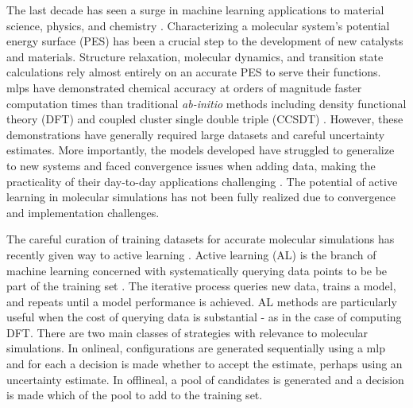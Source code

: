 \documentclass[
 reprint,
 amsmath,
 amssymb,
 aps,
]{revtex4-1}
\begin{document}
The last decade has seen a surge in machine learning applications to material science, physics, and chemistry \cite{Artrith2014, Rupp2015, Natarajan2016, Peterson2016, Behler2016, Khorshidi2016, Bartok2010}. Characterizing a molecular system's potential energy surface (PES) has been a crucial step to the development of new catalysts and materials. Structure relaxation, molecular dynamics, and transition state calculations rely almost entirely on an accurate PES to serve their functions. \gls{mlp}s have demonstrated chemical accuracy at orders of magnitude faster computation times than traditional \textit{ab-initio} methods including density functional theory (DFT) and coupled cluster single double triple (CCSDT)  \cite{Zuo2020}. However, these demonstrations have generally required large datasets and careful uncertainty estimates. More importantly, the models developed have struggled to generalize to new systems and faced convergence issues when adding data, making the practicality of their day-to-day applications challenging \cite{Chen2020, Mueller2020, Behler2016, Schleder2019}. The potential of active learning in molecular simulations has not been fully realized due to convergence and implementation challenges. 

 The careful curation of training datasets for accurate molecular simulations has recently given way to active learning \cite{Vandermause2020, Jinnouchi2019, GarridoTorres2019, DelRio2019}. Active learning (AL) is the branch of machine learning concerned with systematically querying data points to be be part of the training set \cite{Settles2010}. The iterative process queries new data, trains a model, and repeats until a model performance is achieved. AL methods are particularly useful when the cost of querying data is substantial - as in the case of computing DFT. There are two main classes of strategies with relevance to molecular simulations. In \gls{onlineal}, configurations are generated sequentially using a \gls{mlp} and for each a decision is made whether to accept the estimate, perhaps using an uncertainty estimate. In \gls{offlineal}, a pool of candidates is generated and a decision is made which of the pool to add to the training set. 
\end{document}
